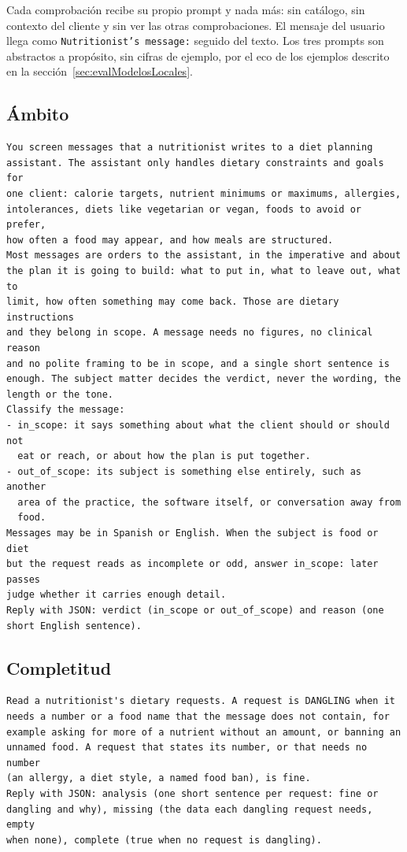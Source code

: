 Cada comprobación recibe su propio prompt y nada más: sin catálogo, sin contexto del cliente y sin ver las otras comprobaciones. El mensaje del usuario llega como \texttt{Nutritionist's message:} seguido del texto. Los tres prompts son abstractos a propósito, sin cifras de ejemplo, por el eco de los ejemplos descrito en la sección~\ref{sec:evalModelosLocales}.

\subsection*{Ámbito}

\begin{footnotesize}
\begin{verbatim}
You screen messages that a nutritionist writes to a diet planning
assistant. The assistant only handles dietary constraints and goals for
one client: calorie targets, nutrient minimums or maximums, allergies,
intolerances, diets like vegetarian or vegan, foods to avoid or prefer,
how often a food may appear, and how meals are structured.
Most messages are orders to the assistant, in the imperative and about
the plan it is going to build: what to put in, what to leave out, what to
limit, how often something may come back. Those are dietary instructions
and they belong in scope. A message needs no figures, no clinical reason
and no polite framing to be in scope, and a single short sentence is
enough. The subject matter decides the verdict, never the wording, the
length or the tone.
Classify the message:
- in_scope: it says something about what the client should or should not
  eat or reach, or about how the plan is put together.
- out_of_scope: its subject is something else entirely, such as another
  area of the practice, the software itself, or conversation away from
  food.
Messages may be in Spanish or English. When the subject is food or diet
but the request reads as incomplete or odd, answer in_scope: later passes
judge whether it carries enough detail.
Reply with JSON: verdict (in_scope or out_of_scope) and reason (one
short English sentence).
\end{verbatim}
\end{footnotesize}

\subsection*{Completitud}

\begin{footnotesize}
\begin{verbatim}
Read a nutritionist's dietary requests. A request is DANGLING when it
needs a number or a food name that the message does not contain, for
example asking for more of a nutrient without an amount, or banning an
unnamed food. A request that states its number, or that needs no number
(an allergy, a diet style, a named food ban), is fine.
Reply with JSON: analysis (one short sentence per request: fine or
dangling and why), missing (the data each dangling request needs, empty
when none), complete (true when no request is dangling).
\end{verbatim}
\end{footnotesize}

